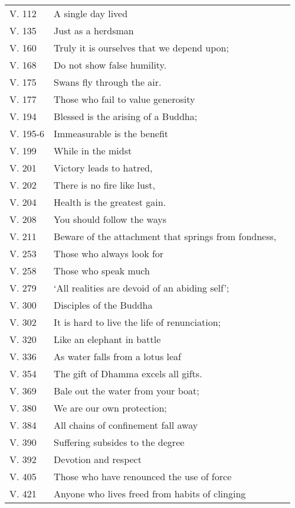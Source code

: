 {\begin{longtable}[c]{llr}
V. 112 & A single day lived & \pageref{dhp-112}\\
V. 135 & Just as a herdsman & \pageref{dhp-135}\\
V. 160 & Truly it is ourselves that we depend upon; & \pageref{dhp-160}\\
V. 168 & Do not show false humility. & \pageref{dhp-168}\\
V. 175 & Swans fly through the air. & \pageref{dhp-175}\\
V. 177 & Those who fail to value generosity & \pageref{dhp-177}\\
V. 194 & Blessed is the arising of a Buddha; & \pageref{dhp-194}\\
V. 195-6 & Immeasurable is the benefit & \pageref{dhp-195}\\
V. 199 & While in the midst & \pageref{dhp-199}\\
V. 201 & Victory leads to hatred, & \pageref{dhp-201}\\
V. 202 & There is no fire like lust, & \pageref{dhp-202}\\
V. 204 & Health is the greatest gain. & \pageref{dhp-204}\\
V. 208 & You should follow the ways & \pageref{dhp-208}\\
V. 211 & Beware of the attachment that springs from fondness, & \pageref{dhp-211}\\
V. 253 & Those who always look for & \pageref{dhp-253}\\
V. 258 & Those who speak much & \pageref{dhp-258}\\
V. 279 & `All realities are devoid of an abiding self'; & \pageref{dhp-279}\\
V. 300 & Disciples of the Buddha & \pageref{dhp-300}\\
V. 302 & It is hard to live the life of renunciation; & \pageref{dhp-302}\\
V. 320 & Like an elephant in battle & \pageref{dhp-320}\\
V. 336 & As water falls from a lotus leaf & \pageref{dhp-336}\\
V. 354 & The gift of Dhamma excels all gifts. & \pageref{dhp-354}\\
V. 369 & Bale out the water from your boat; & \pageref{dhp-369}\\
V. 380 & We are our own protection; & \pageref{dhp-380}\\
V. 384 & All chains of confinement fall away & \pageref{dhp-384}\\
V. 390 & Suffering subsides to the degree & \pageref{dhp-390}\\
V. 392 & Devotion and respect & \pageref{dhp-392}\\
V. 405 & Those who have renounced the use of force & \pageref{dhp-405}\\
V. 421 & Anyone who lives freed from habits of clinging & \pageref{dhp-421}\\
\end{longtable}

}

